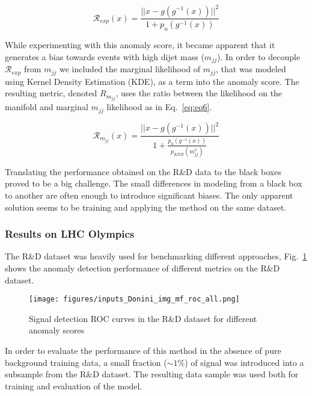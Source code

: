 \documentclass[a4paper,11pt]{article}
\begin{document}
\begin{equation}
    \mathcal{R}_{exp}(x) = \frac{\lvert \lvert x-g(g^{-1}(x)) \lvert \lvert ^2}{1+p_{u}(g^{-1}(x))}
    \label{eq:eq5}
\end{equation}

While experimenting with this anomaly score, it became apparent that it generates a bias towards events with high dijet mass ($m_{jj}$). In order to decouple $ \mathcal{R}_{exp}$ from $m_{jj}$ we included the marginal likelihood of $m_{jj}$, that was modeled using Kernel Density Estimation (KDE), as a term into the anomaly score. The resulting metric, denoted ${R}_{m_{jj}}$, uses the ratio between the likelihood on the manifold and marginal $m_{jj}$ likelihood as in Eq.~\ref{eq:eq6}.

\begin{equation}
    \mathcal{R}_{m_{jj}}(x) = \frac{\lvert \lvert x-g(g^{-1}(x)) \lvert \lvert ^2}{1+\frac{p_{u}(g^{-1}(x))}{p_{KDE}(m^{x}_{jj})}}
    \label{eq:eq6}
\end{equation}

Translating the performance obtained on the R\&D data to the black boxes proved to be a big challenge. The small differences in modeling from a black box to another are often enough to introduce significant biases. The only apparent solution seems to be training and applying the method on the same dataset.


\subsubsection{Results on LHC Olympics}
\label{sec:results}

The R\&D dataset was heavily used for benchmarking different approaches, Fig.~\ref{fig:fig2} shows the anomaly detection performance of different metrics on the R\&D dataset. 

\begin{figure}[h!]
    \centering
    \texttt{[image: figures/inputs\_Donini\_img\_mf\_roc\_all.png]}
    \caption{Signal detection ROC curves in the R\&D dataset for different anomaly scores}
    \label{fig:fig2}
\end{figure}

In order to evaluate the performance of this method in the absence of pure background training data, a small fraction ($\sim 1\%$) of signal was introduced into a subsample from the R\&D dataset. The resulting data sample was used both for training and evaluation of the model.
\end{document}
